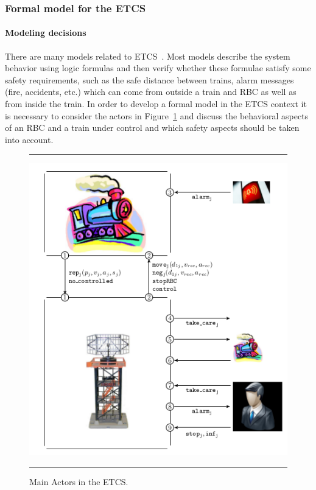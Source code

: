 \documentclass{template/openetcs_article}
\begin{document}
\subsubsection{Formal model for the ETCS}\label{subsec3.1}

\paragraph{Modeling decisions} 

There are many models related to ETCS~\cite{pjesh01,zh05,Ammann2011,ltlzx11,Feuser2012}. Most models describe the system behavior using logic formulas and then verify whether these formulae satisfy some safety requirements, such as the safe distance between trains, alarm messages (fire, accidents, etc.) which can come from outside a train and RBC as well as from inside the train. In order to develop a formal model in the ETCS context it is necessary to consider the actors in Figure~\ref{fig:model} and discuss the behavioral aspects of an RBC and a train under control and which safety aspects should be taken into account. 

\begin{figure}[t!]
\hrule
\sspace

\begin{center}
  \includegraphics[width=.5\textwidth]{figures/ETCSModel.png}
  \caption{Main Actors in the ETCS.}
  \label{fig:model}
\end{center}
\sspace
\hrule
\end{figure}
\end{document}
